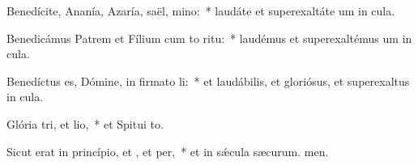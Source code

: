 \item Benedícite, Ananía, Azaría, saël, mino:~* laudáte et superexaltáte um in cula.
\item Benedicámus Patrem et Fílium cum to ritu:~* laudémus et superexaltémus um in cula.
\item Benedíctus es, Dómine, in firmato li:~* et laudábilis, et gloriósus, et superexaltus in cula.
\item Glória tri, et lio,~* et Spitui to.
\item Sicut erat in princípio, et , et per,~* et in sǽcula sæcurum. men.
